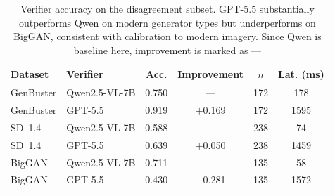 \documentclass{ieeeaccess}
\begin{document}
\begin{table}[h]
\large
\centering
\caption{Detection results on GenImage BigGAN. FFT and semantic detectors near-saturate.
VLM escalation is rarely triggered ($<$1.3\%).}
\label{tab:biggan}
\end{table}

\begin{table}[h]
\centering
\small
\setlength{\tabcolsep}{3pt}  %
\caption{Verifier accuracy on the disagreement subset. GPT-5.5 substantially outperforms
Qwen on modern generator types but underperforms on BigGAN, consistent with calibration
to modern imagery. Since Qwen is baseline here, improvement is marked as ---}
\label{tab:verifier_comparison}
\begin{tabular}{llcccc}
\toprule
Dataset & Verifier & Acc. & Improvement & $n$ & Lat. (ms) \\
\midrule
GenBuster & Qwen2.5-VL-7B  & 0.750 & ---        & 172 & 178 \\
GenBuster & GPT-5.5        & 0.919 & $+$0.169   & 172 & 1595 \\
\midrule
SD~1.4    & Qwen2.5-VL-7B  & 0.588 & ---        & 238 & 74 \\
SD~1.4    & GPT-5.5        & 0.639 & $+$0.050   & 238 & 1459 \\
\midrule
BigGAN    & Qwen2.5-VL-7B  & 0.711 & ---        & 135 & 58 \\
BigGAN    & GPT-5.5        & 0.430 & $-$0.281   & 135 & 1572 \\
\bottomrule
\end{tabular}
\end{table}
\end{document}
